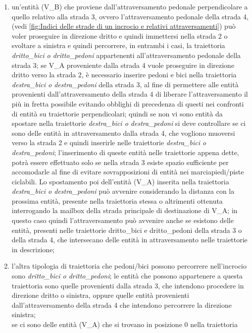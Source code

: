 \begin{enumerate}
\begin{enumerate}
\item un'entità (V\_B) che proviene dall'attraversamento pedonale perpendicolare a quello relativo alla strada 3, ovvero l'attraversamento pedonale della strada 4, (vedi \ref{fig:Indici delle strade di un incrocio e relativi attraversamenti}) può voler proseguire in direzione dritto e quindi immettersi nella strada 2 o svoltare a sinistra e quindi percorrere, in entrambi i casi, la traiettoria \textit{drit\-to\_bi\-ci o drit\-to\_pe\-do\-ni} appartenenti all'attraversamento pedonale della strada 3; se V\_A proveniente dalla strada 4 vuole proseguire in direzione dritto verso la strada 2, è necessario inserire pedoni e bici nella traiettoria \textit{des\-tra\_bi\-ci o des\-tra\_pe\-do\-ni} della strada 3, al fine di permettere alle entità provenienti dall'attraversamento della strada 4 di liberare l'attraversamento il più in fretta possibile evitando obblighi di precedenza di questi nei confronti di entità su traiettorie perpendicolari; quindi se non vi sono entità da spostare nella traiettorie \textit{des\-tra\_bi\-ci o des\-tra\_pe\-do\-ni} si deve controllare se ci sono delle entità in attraversamento dalla strada 4, che vogliono muoversi verso la strada 2 e quindi inserirle nelle traiettorie \textit{des\-tra\_bi\-ci o des\-tra\_pe\-do\-ni}; l'inserimento di queste entità nelle traiettorie appena dette, potrà essere effettuato solo se nella strada 3 esiste spazio sufficiente per accomodarle al fine di evitare sovrapposizioni di entità nei marciapiedi/piste ciclabili. Lo spostamento poi dell'entità (V\_A) inserita nella traiettoria \textit{des\-tra\_bi\-ci o des\-tra\_pe\-do\-ni} può avvenire considerando la distanza con la prossima entità, presente nella traiettoria stessa o altrimenti ottenuta interrogando la mailbox della strada principale di destinazione di V\_A; in questo caso quindi l'attraversamento può avvenire anche se esistono delle entità, presenti nelle traiettorie drit\-to\_bi\-ci e drit\-to\_pe\-do\-ni della strada 3 o della strada 4, che intersecano delle entità in attraversamento nelle traiettorie in descrizione;
\item l'altra tipologia di traiettoria che pedoni/bici possono percorrere nell'incrocio sono \textit{drit\-to\_bi\-ci o drit\-to\_pe\-do\-ni}; le entità che possono appartenere a questa traiettoria sono quelle provenienti dalla strada 3, che intendono procedere in direzione dritto o sinistra, oppure quelle entità provenienti dall'attraversamento della strada 4 che intendono percorrere la direzione sinistra;\\
se ci sono delle entità (V\_A) che si trovano in posizione 0 nella traiettoria

\end{enumerate}
\end{enumerate}
